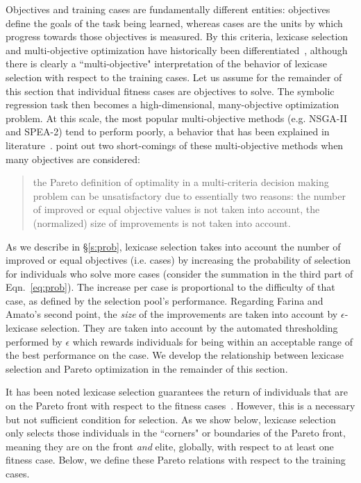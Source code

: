 \documentclass[twoside]{article}
\begin{document}
Objectives and training cases are fundamentally different entities: objectives define the goals of the task being learned, whereas cases are the units by which progress towards those objectives is measured. By this criteria, lexicase selection and multi-objective optimization have historically been differentiated~\citep{helmuth_general_2015}, although there is clearly a ``multi-objective" interpretation of the behavior of lexicase selection with respect to the training cases. Let us assume for the remainder of this section that individual fitness cases are objectives to solve. The symbolic regression task then becomes a high-dimensional, many-objective optimization problem. At this scale, the most popular multi-objective methods (e.g. NSGA-II and SPEA-2) tend to perform poorly, a behavior that has been explained in literature~\citep{wagner_pareto-_2007, farina_optimal_2002}. \cite{farina_optimal_2002} point out two short-comings of these multi-objective methods when many objectives are considered: \begin{quote}
the Pareto definition of optimality in a multi-criteria decision making problem can be unsatisfactory due to essentially two reasons: the number of improved or equal objective values is not taken into account, the (normalized) size of improvements is not taken into account.
\end{quote}

As we describe in \S\ref{s:prob}, lexicase selection takes into account the number of improved or equal objectives (i.e. cases) by increasing the probability of selection for individuals who solve more cases (consider the summation in the third part of Eqn.~\ref{eq:prob}). The increase per case is proportional to the difficulty of that case, as defined by the selection pool's performance. Regarding Farina and Amato's second point, the {\it size} of the improvements are taken into account by $\epsilon$-lexicase selection. They are taken into account by the automated thresholding performed by $\epsilon$ which rewards individuals for being within an acceptable range of the best performance on the case. We develop the relationship between lexicase selection and Pareto optimization in the remainder of this section. 

It has been noted lexicase selection guarantees the return of individuals that are on the Pareto front with respect to the fitness cases~\citep{la_cava_epsilon-lexicase_2016}. However, this is a necessary but not sufficient condition for selection. As we show below, lexicase selection only selects those individuals in the ``corners" or boundaries of the Pareto front, meaning they are on the front {\it and} elite, globally, with respect to at least one fitness case. Below, we define these Pareto relations with respect to the training cases. 
\end{document}
